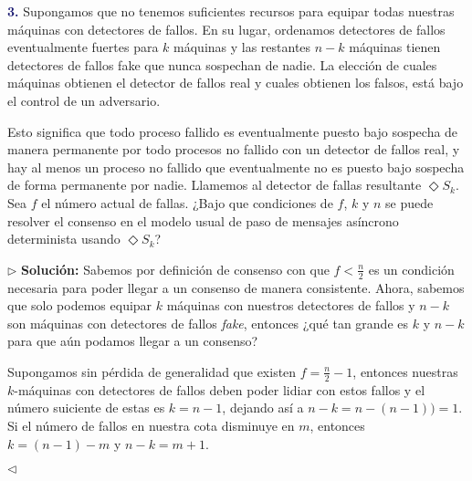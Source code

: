 \newline
\textbf{\textcolor{MidnightBlue}{3.}}
Supongamos que no tenemos suficientes recursos para equipar todas nuestras máquinas
con detectores de fallos. En su lugar, ordenamos detectores de fallos eventualmente
fuertes para $k$ máquinas y las restantes $n-k$ máquinas tienen detectores de fallos
fake que nunca sospechan de nadie. La elección de cuales máquinas obtienen el
detector 
de fallos real y cuales obtienen los falsos, está bajo el control de un adversario.

Esto significa que todo proceso fallido es eventualmente puesto bajo sospecha de
manera permanente por todo procesos no fallido con un detector de fallos real, y hay
al menos un proceso no fallido que eventualmente no es puesto bajo sospecha de forma
permanente por nadie. Llamemos al detector de fallas resultante $\Diamond S_k$.\\

Sea $f$ el número actual de fallas. ¿Bajo que condiciones de $f$, $k$ y $n$ se puede
resolver el consenso en el modelo usual de paso de mensajes asíncrono determinista
usando $\Diamond S_k$? \newline

$\rhd$ \textbf{Solución:} Sabemos por definición de consenso con  que
$f < \frac{n}{2}$ es un condición necesaria para poder llegar a un consenso de manera
consistente. Ahora, sabemos que solo podemos equipar $k$ máquinas con nuestros detectores
de fallos y $n - k$ son máquinas con detectores de fallos \textit{fake}, entonces
¿qué tan grande es $k$ y $n - k$ para que aún podamos llegar a un consenso?

Supongamos sin pérdida de generalidad que existen $f = \frac{n}{2} - 1$, entonces nuestras
$k$-máquinas con detectores de fallos deben poder lidiar con estos fallos y el número
suiciente de estas es $k = n - 1$, dejando así a $n - k = n - (n - 1) ) = 1$. Si el número
de fallos en nuestra cota disminuye en $m$, entonces $k = (n - 1) - m$ y $n - k = m + 1$.

\hfill $\lhd$
